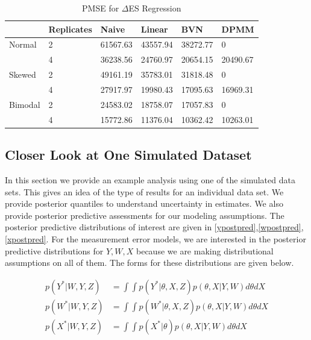 \documentclass[11pt]{article}\usepackage[]{graphicx}\usepackage[]{color}
\begin{document}
\begin{table}[ht]
\centering
\begin{tabular}{ll|llll}
  \hline
 & Replicates & Naive & Linear & BVN & DPMM \\ 
  \hline
Normal & 2 & 61567.63 & 43557.94 & 38272.77 & 0 \\ 
   & 4 & 36238.56 & 24760.97 & 20654.15 & 20490.67 \\ 
  Skewed & 2 & 49161.19 & 35783.01 & 31818.48 & 0 \\ 
   & 4 & 27917.97 & 19980.43 & 17095.63 & 16969.31 \\ 
  Bimodal & 2 & 24583.02 & 18758.07 & 17057.83 & 0 \\ 
   & 4 & 15772.86 & 11376.04 & 10362.42 & 10263.01 \\ 
   \hline
\end{tabular}
\caption{PMSE for $\Delta$ES Regression} 
\label{pmsees}
\end{table}


\subsection{Closer Look at One Simulated Dataset}
 
In this section we provide an example analysis using one of the simulated data sets. This gives an idea of the type of results for an individual data set. We provide posterior quantiles to understand uncertainty in estimates. We also provide posterior predictive assessments for our modeling assumptions.  The posterior predictive distributions of interest are given in \eqref{ypostpred},\eqref{wpostpred},\eqref{xpostpred}. For the measurement error models, we are interested in the posterior predictive distributions for $Y,W,X$ because we are making distributional assumptions on all of them. The forms for these distributions are given below.
  
\begin{align}
  \label{ypostpred}
  p(Y^*|W,Y,Z) &= \int \int p(Y^*|\theta,X,Z) p(\theta, X|Y,W) d\theta dX \\
  \label{wpostpred}
  p(W^*|W,Y,Z) &= \int \int p(W^*|\theta,X,Z) p(\theta, X|Y,W) d\theta dX \\
  \label{xpostpred}
  p(X^*|W,Y,Z) &= \int \int p(X^*|\theta) p(\theta, X|Y,W) d\theta dX
\end{align}
\end{document}
